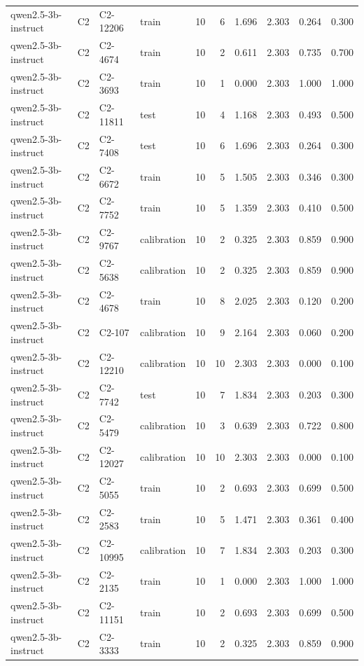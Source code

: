\begin{table}
\begin{tabular}{llllrrrrrr}
qwen2.5-3b-instruct & C2 & C2-12206 & train & 10 & 6 & 1.696 & 2.303 & 0.264 & 0.300 \\
qwen2.5-3b-instruct & C2 & C2-4674 & train & 10 & 2 & 0.611 & 2.303 & 0.735 & 0.700 \\
qwen2.5-3b-instruct & C2 & C2-3693 & train & 10 & 1 & 0.000 & 2.303 & 1.000 & 1.000 \\
qwen2.5-3b-instruct & C2 & C2-11811 & test & 10 & 4 & 1.168 & 2.303 & 0.493 & 0.500 \\
qwen2.5-3b-instruct & C2 & C2-7408 & test & 10 & 6 & 1.696 & 2.303 & 0.264 & 0.300 \\
qwen2.5-3b-instruct & C2 & C2-6672 & train & 10 & 5 & 1.505 & 2.303 & 0.346 & 0.300 \\
qwen2.5-3b-instruct & C2 & C2-7752 & train & 10 & 5 & 1.359 & 2.303 & 0.410 & 0.500 \\
qwen2.5-3b-instruct & C2 & C2-9767 & calibration & 10 & 2 & 0.325 & 2.303 & 0.859 & 0.900 \\
qwen2.5-3b-instruct & C2 & C2-5638 & calibration & 10 & 2 & 0.325 & 2.303 & 0.859 & 0.900 \\
qwen2.5-3b-instruct & C2 & C2-4678 & train & 10 & 8 & 2.025 & 2.303 & 0.120 & 0.200 \\
qwen2.5-3b-instruct & C2 & C2-107 & calibration & 10 & 9 & 2.164 & 2.303 & 0.060 & 0.200 \\
qwen2.5-3b-instruct & C2 & C2-12210 & calibration & 10 & 10 & 2.303 & 2.303 & 0.000 & 0.100 \\
qwen2.5-3b-instruct & C2 & C2-7742 & test & 10 & 7 & 1.834 & 2.303 & 0.203 & 0.300 \\
qwen2.5-3b-instruct & C2 & C2-5479 & calibration & 10 & 3 & 0.639 & 2.303 & 0.722 & 0.800 \\
qwen2.5-3b-instruct & C2 & C2-12027 & calibration & 10 & 10 & 2.303 & 2.303 & 0.000 & 0.100 \\
qwen2.5-3b-instruct & C2 & C2-5055 & train & 10 & 2 & 0.693 & 2.303 & 0.699 & 0.500 \\
qwen2.5-3b-instruct & C2 & C2-2583 & train & 10 & 5 & 1.471 & 2.303 & 0.361 & 0.400 \\
qwen2.5-3b-instruct & C2 & C2-10995 & calibration & 10 & 7 & 1.834 & 2.303 & 0.203 & 0.300 \\
qwen2.5-3b-instruct & C2 & C2-2135 & train & 10 & 1 & 0.000 & 2.303 & 1.000 & 1.000 \\
qwen2.5-3b-instruct & C2 & C2-11151 & train & 10 & 2 & 0.693 & 2.303 & 0.699 & 0.500 \\
qwen2.5-3b-instruct & C2 & C2-3333 & train & 10 & 2 & 0.325 & 2.303 & 0.859 & 0.900 \\

\end{tabular}
\end{table}
